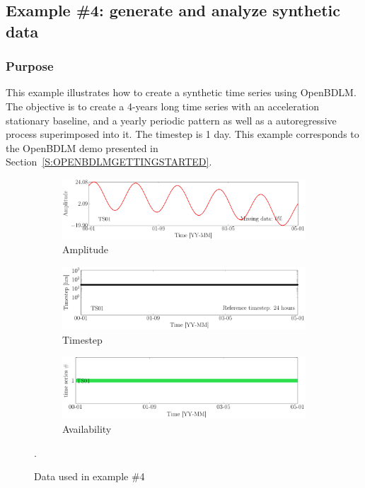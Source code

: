 \subsection{Example \#4: generate and analyze synthetic data }
\label{S:EXAMPLESYNTHETICDATA}


\subsubsection{Purpose}
This example illustrates how to create a synthetic time series using OpenBDLM.
The objective is to create a 4-years long time series with an acceleration stationary baseline, and a yearly periodic pattern as well as a autoregressive process superimposed into it. 
The timestep is 1 day.
This example corresponds to the OpenBDLM demo presented in Section~\ref{S:OPENBDLMGETTINGSTARTED}.

\begin{figure}[h!]
\centering
\begin{subfigure}{\linewidth}
\includegraphics[width=0.9\linewidth]{./docfigs/Example_SYNTHETIC/raw/ALL_AMPLITUDES.pdf} 
\caption{Amplitude}
\end{subfigure}
\begin{subfigure}{\linewidth}
\includegraphics[width=0.9\linewidth]{./docfigs/Example_SYNTHETIC/raw/ALL_TIMESTEPS.pdf}
\caption{Timestep}
\end{subfigure}
\begin{subfigure}{\linewidth}
\includegraphics[width=0.9\linewidth]{./docfigs/Example_SYNTHETIC/raw/AVAILABILITY.pdf}
\caption{Availability}
\end{subfigure}
\caption{Data used in example \#4}.
\label{fig:DataSummaryRaw4}
\end{figure}


